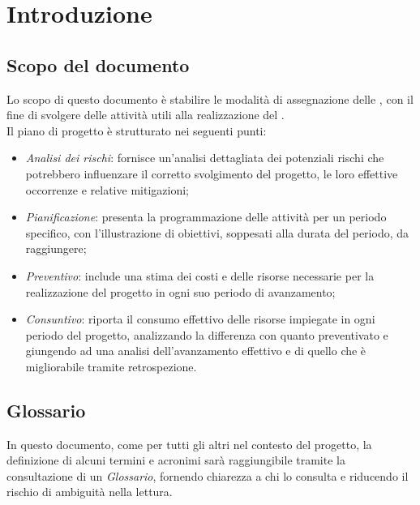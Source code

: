 \chapter{Introduzione}\label{chap:intro}

\section{Scopo del documento}
Lo scopo di questo documento è stabilire le modalità di assegnazione delle , con il fine di svolgere delle attività utili alla realizzazione del .\\Il piano di progetto è strutturato nei seguenti punti:
\begin{itemize}
    \item \textit{Analisi dei rischi}: fornisce un'analisi dettagliata dei potenziali rischi che potrebbero influenzare il corretto svolgimento del progetto, le loro effettive occorrenze e relative mitigazioni;
    \item \textit{Pianificazione}: presenta la programmazione delle attività per un periodo specifico, con l'illustrazione di obiettivi, soppesati alla durata del periodo, da raggiungere;
    \item \textit{Preventivo}: include una stima dei costi e delle risorse necessarie per la realizzazione del progetto in ogni suo periodo di avanzamento;
    \item \textit{Consuntivo}: riporta il consumo effettivo delle risorse impiegate in ogni periodo del progetto, analizzando la differenza con quanto preventivato e giungendo ad una analisi dell'avanzamento effettivo e di quello che è migliorabile tramite retrospezione.
\end{itemize}


\section{Glossario}
In questo documento, come per tutti gli altri nel contesto del progetto, la definizione di alcuni termini e acronimi sarà raggiungibile tramite la consultazione di un \textit{Glossario}, fornendo chiarezza a chi lo consulta e riducendo il rischio di ambiguità nella lettura.
